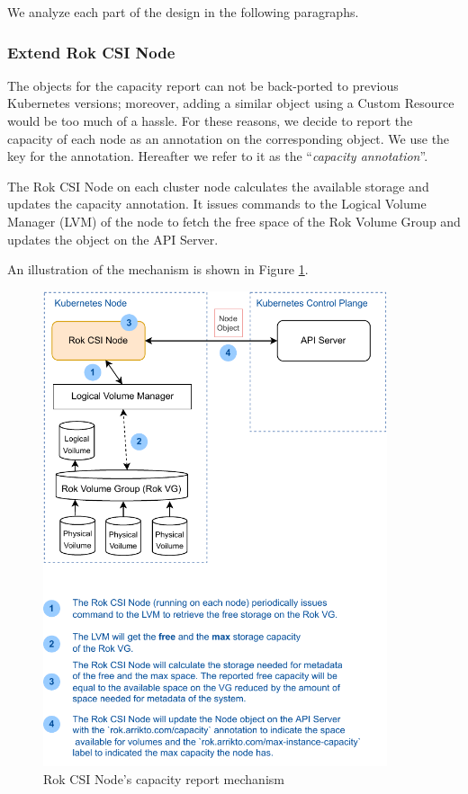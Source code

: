 We analyze each part of the design in the following paragraphs.

\subsubsection{Extend Rok CSI Node}
\label{section:capacity-annotation}
The  objects for the capacity report can not be
back-ported to previous Kubernetes versions; moreover, adding a similar object
using a Custom Resource would be too much of a hassle. For these reasons, we
decide to report the capacity of each node as an annotation on the corresponding
 object. We use the  key for the
annotation. Hereafter we refer to it as the ``\textit{capacity annotation}''.

The Rok CSI Node on each cluster node calculates the available storage and
updates the capacity annotation. It issues commands to the Logical Volume
Manager (LVM) of the node to fetch the free space of the Rok Volume Group and
updates the  object on the API Server.

An illustration of the mechanism is shown in Figure \ref{fig:csi-capacity}.

\begin{figure}[ht]
      \centering
      \includegraphics[width=0.9\textwidth]{resources/csi-storage-calculation.pdf}
      \caption{Rok CSI Node's capacity report mechanism}
      \label{fig:csi-capacity}
\end{figure}


